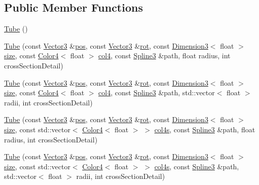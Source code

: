 \subsection*{Public Member Functions}
\begin{DoxyCompactItemize}
\item 
\hyperlink{class_tube_a0c92973d2be8bc65f8f971cbc97c97f1}{Tube} ()
\item 
\hyperlink{class_tube_af7386bb9d7e113e8014fd0bad771592b}{Tube} (const \hyperlink{class_vector3}{Vector3} \&\hyperlink{class_geom_base_ace2fc0557767dbb702aaf1655a85ed92}{pos}, const \hyperlink{class_vector3}{Vector3} \&\hyperlink{class_geom_base_a7de363bab1e976c73e495cf973a51de7}{rot}, const \hyperlink{class_dimension3}{Dimension3}$<$ float $>$ \hyperlink{gl3_8h_a79ef9eb3e59c4bb34c4b9fbeb8d28ff7}{size}, const \hyperlink{class_color4}{Color4}$<$ float $>$ \hyperlink{class_geom_base_acd58b67fcdac4428f66bea2c58c3aad8}{col4}, const \hyperlink{class_spline3}{Spline3} \&path, float radius, int cross\-Section\-Detail)
\item 
\hyperlink{class_tube_a995bae01cb3e2b903440297b767d7f97}{Tube} (const \hyperlink{class_vector3}{Vector3} \&\hyperlink{class_geom_base_ace2fc0557767dbb702aaf1655a85ed92}{pos}, const \hyperlink{class_vector3}{Vector3} \&\hyperlink{class_geom_base_a7de363bab1e976c73e495cf973a51de7}{rot}, const \hyperlink{class_dimension3}{Dimension3}$<$ float $>$ \hyperlink{gl3_8h_a79ef9eb3e59c4bb34c4b9fbeb8d28ff7}{size}, const \hyperlink{class_color4}{Color4}$<$ float $>$ \hyperlink{class_geom_base_acd58b67fcdac4428f66bea2c58c3aad8}{col4}, const \hyperlink{class_spline3}{Spline3} \&path, std\-::vector$<$ float $>$ radii, int cross\-Section\-Detail)
\item 
\hyperlink{class_tube_a36f0bfcdea284cfa54229531937a5d56}{Tube} (const \hyperlink{class_vector3}{Vector3} \&\hyperlink{class_geom_base_ace2fc0557767dbb702aaf1655a85ed92}{pos}, const \hyperlink{class_vector3}{Vector3} \&\hyperlink{class_geom_base_a7de363bab1e976c73e495cf973a51de7}{rot}, const \hyperlink{class_dimension3}{Dimension3}$<$ float $>$ \hyperlink{gl3_8h_a79ef9eb3e59c4bb34c4b9fbeb8d28ff7}{size}, const std\-::vector$<$ \hyperlink{class_color4}{Color4}$<$ float $>$ $>$ \hyperlink{class_geom_base_a0a55c12de2788567600e4477017df3fb}{col4s}, const \hyperlink{class_spline3}{Spline3} \&path, float radius, int cross\-Section\-Detail)
\item 
\hyperlink{class_tube_a7b0677ab3a81f935f5768ceb397e7e00}{Tube} (const \hyperlink{class_vector3}{Vector3} \&\hyperlink{class_geom_base_ace2fc0557767dbb702aaf1655a85ed92}{pos}, const \hyperlink{class_vector3}{Vector3} \&\hyperlink{class_geom_base_a7de363bab1e976c73e495cf973a51de7}{rot}, const \hyperlink{class_dimension3}{Dimension3}$<$ float $>$ \hyperlink{gl3_8h_a79ef9eb3e59c4bb34c4b9fbeb8d28ff7}{size}, const std\-::vector$<$ \hyperlink{class_color4}{Color4}$<$ float $>$ $>$ \hyperlink{class_geom_base_a0a55c12de2788567600e4477017df3fb}{col4s}, const \hyperlink{class_spline3}{Spline3} \&path, std\-::vector$<$ float $>$ radii, int cross\-Section\-Detail)

\end{DoxyCompactItemize}
